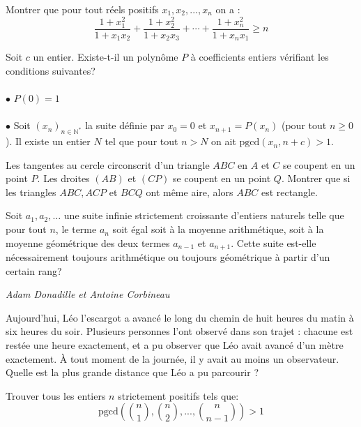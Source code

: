 \begin{exo}{}
Montrer que pour tout réels positifs $x_1,x_2,...,x_n$ on a :
$$\frac{1+x_{1}^2}{1+x_{1}x_{2}}+\frac{1+x_{2}^2}{1+x_{2}x_{3}}+\cdots+\frac{1+x_{n}^2}{1+x_{n}x_{1}}\geq n$$
\end{exo}

\begin{exo}{}
Soit $c$ un entier. Existe-t-il un polynôme $P$ à coefficients entiers vérifiant les conditions suivantes?\\~~\\
$\bullet$ $P(0)=1$\\~~\\
$\bullet$ Soit $(x_n)_{n\in \mathbb{N}^*}$  la suite définie par $x_0=0$ et $x_{n+1}=P(x_n)$ (pour tout $n\ge 0$). Il existe un entier $N$ tel que pour tout $n>N$ on ait $\text{pgcd}(x_n,n+c)>1$.
\end{exo}

\begin{exo}{}
Les tangentes au cercle circonscrit d'un triangle $ABC$ en $A$ et $C$ se coupent en un point $P$. Les droites $(AB)$ et $(CP)$ se coupent en un point $Q$. Montrer que si les triangles $ABC,ACP$ et $BCQ$ ont même aire, alors $ABC$ est rectangle.
\end{exo}

\begin{exo}{}Soit $a_1,a_2,\ldots$ une suite infinie strictement croissante d'entiers naturels telle que pour tout $n$, le terme $a_n$ soit égal soit à la moyenne arithmétique, soit à la moyenne géométrique des deux termes $a_{n-1}$ et $a_{n+1}$. Cette suite est-elle nécessairement toujours arithmétique ou toujours géométrique à partir d'un certain rang?

\medskip
\textit{Adam Donadille et Antoine Corbineau}
\end{exo}

\begin{exo}{}
Aujourd'hui, Léo l'escargot a avancé le long du chemin de huit heures du matin à six heures du soir. Plusieurs personnes l'ont observé dans son trajet : chacune est restée une heure exactement, et a pu observer que Léo avait avancé d'un mètre exactement. \`{A} tout moment de la journée, il y avait au moins un observateur. Quelle est la plus grande distance que Léo a pu parcourir ?
\end{exo}


\begin{exo}{}
Trouver tous les entiers $n$ strictement positifs tels que:
$$\text{pgcd}\left(\binom{n}{1},\binom{n}{2},...,\binom{n}{n-1}\right)>1$$

\end{exo}

